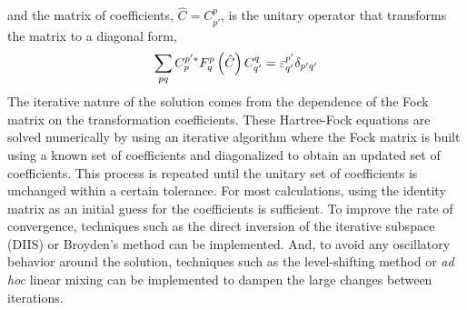 \documentclass[thesis.tex]{subfiles}
\begin{document}
and the matrix of coefficients, $\hat{C} = C^{p}_{p'}$, is the unitary operator that transforms the matrix to a diagonal form,
\begin{equation}
  \sum_{\mathclap{pq}}C^{p'*}_{p}F^{p}_{q}\left(\hat{C}\right)C^{q}_{q'} = \varepsilon^{p'}_{q'}\delta_{p'q'}
\end{equation}
The iterative nature of the solution comes from the dependence of the Fock matrix on the transformation coefficients. These Hartree-Fock equations are solved numerically by using an iterative algorithm where the Fock matrix is built using a known set of coefficients and diagonalized to obtain an updated set of coefficients.  This process is repeated until the unitary set of coefficients is unchanged within a certain tolerance.  For most calculations, using the identity matrix as an initial guess for the coefficients is sufficient.  To improve the rate of convergence, techniques such as the direct inversion of the iterative subspace (DIIS) \cite{PULAY1980393,PULAY1982556} or Broyden's method \cite{BROYDEN1965557} can be implemented.  And, to avoid any oscillatory behavior around the solution, techniques such as the level-shifting method or \textit{ad hoc} linear mixing can be implemented to dampen the large changes between iterations.
\end{document}

